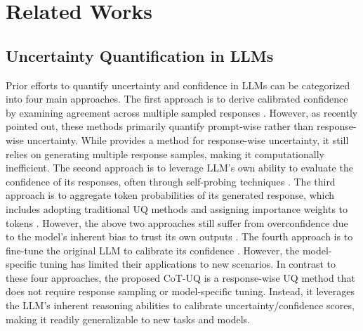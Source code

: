 \documentclass[11pt]{article}
\begin{document}
\section{Related Works}

\subsection{Uncertainty Quantification in LLMs}
Prior efforts to quantify uncertainty and confidence in LLMs can be categorized into four main approaches. The first approach is to derive calibrated confidence by examining agreement across multiple sampled responses \citep{malinin2021uncertainty, kuhn2023semantic, manakul2023selfcheckgpt, tian2023fine}. However, as \citet{qiu2024semantic} recently pointed out, these methods primarily quantify prompt-wise rather than response-wise uncertainty. While \citet{qiu2024semantic} provides a method for response-wise uncertainty, it still relies on generating multiple response samples, making it computationally inefficient. The second approach is to leverage LLM's own ability to evaluate the confidence of its responses, often through self-probing techniques \citep{kadavath2022language, tian2023just, xiong2023can}. The third approach is to aggregate token probabilities of its generated response, which includes adopting traditional UQ methods \citep{xiao2022uncertainty, ye2024benchmarking} and assigning importance weights to tokens \citep{duan2024shifting, bakman2024mars}. However, the above two approaches still suffer from overconfidence due to the model’s inherent bias to trust its own outputs \citep{mielke2022reducing, lin2022teaching}. The fourth approach is to fine-tune the original LLM to calibrate its confidence \citep{lin2022teaching, kapoor2024large}. However, the model-specific tuning has limited their applications to new scenarios. In contrast to these four approaches, the proposed CoT-UQ is a response-wise UQ method that does not require response sampling or model-specific tuning. Instead, it leverages the LLM’s inherent reasoning abilities to calibrate uncertainty/confidence scores, making it readily generalizable to new tasks and models. 
\end{document}
